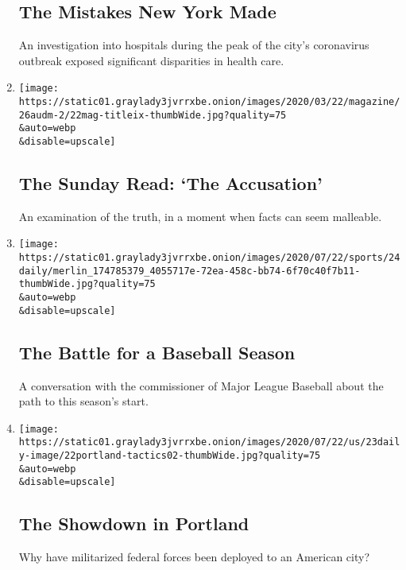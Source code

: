\begin{enumerate}
  \hypertarget{the-mistakes-new-york-made}{%
  \subsection{The Mistakes New York
  Made}\label{the-mistakes-new-york-made}}

  An investigation into hospitals during the peak of the city's
  coronavirus outbreak exposed significant disparities in health care.
\item
  \href{/2020/07/26/podcasts/the-daily/the-accusation-the-sunday-read.html}{}

  \texttt{[image: https://static01.graylady3jvrrxbe.onion/images/2020/03/22/magazine/26audm-2/22mag-titleix-thumbWide.jpg?quality=75\\\&auto=webp\\\&disable=upscale]}

  \hypertarget{the-sunday-read-the-accusation}{%
  \subsection{The Sunday Read: `The
  Accusation'}\label{the-sunday-read-the-accusation}}

  An examination of the truth, in a moment when facts can seem
  malleable.
\item
  \href{/2020/07/24/podcasts/the-daily/mlb-baseball-season-coronavirus.html}{}

  \texttt{[image: https://static01.graylady3jvrrxbe.onion/images/2020/07/22/sports/24daily/merlin\_174785379\_4055717e-72ea-458c-bb74-6f70c40f7b11-thumbWide.jpg?quality=75\\\&auto=webp\\\&disable=upscale]}

  \hypertarget{the-battle-for-a-baseball-season}{%
  \subsection{The Battle for a Baseball
  Season}\label{the-battle-for-a-baseball-season}}

  A conversation with the commissioner of Major League Baseball about
  the path to this season's start.
\item
  \href{/2020/07/23/podcasts/the-daily/portland-protests.html}{}

  \texttt{[image: https://static01.graylady3jvrrxbe.onion/images/2020/07/22/us/23daily-image/22portland-tactics02-thumbWide.jpg?quality=75\\\&auto=webp\\\&disable=upscale]}

  \hypertarget{the-showdown-in-portland}{%
  \subsection{The Showdown in Portland}\label{the-showdown-in-portland}}

  Why have militarized federal forces been deployed to an American city?
\end{enumerate}

